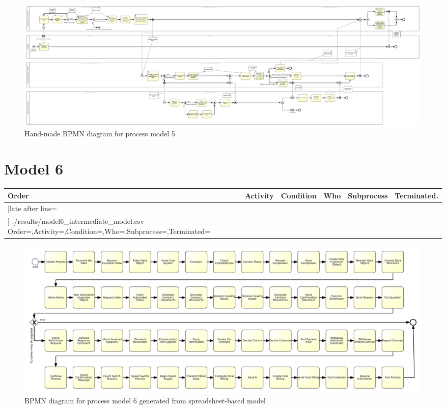 \begin{figure}[H]
	\centering
	\includegraphics[width=0.95\textheight, angle=90]{./bpmn/model5.pdf}
	\caption{Hand-made BPMN diagram for process model 5}
	\label{bpmn:model5}
\end{figure}

\section{Model 6}
\begin{tcolorbox}[
	breakable,
	arc=0mm,
	left=1pt,
	right = 1pt,
	boxrule=0mm,
	colback = {white},
	]
	\texttt{}
\end{tcolorbox}
\label{txt:model6}
\newpage

{\scriptsize
	\begin{longtable}{|p{0.03 \hsize}|p{0.25 \hsize}|p{0.15 \hsize}|p{0.2 \hsize}|p{0.1 \hsize}|p{0.1 \hsize}|}
		\hline
		Order & Activity & Condition & Who & Subprocess & Terminated.
		\\\hline\hline
		\csvreader[late after line=\\\hline]
		{./results/model6_intermediate_model.csv}
		{Order=\Order,Activity=\Activity,Condition=\Condition,Who=\Who,Subprocess=\Subprocess,Terminated=\Terminated}
		{\Order & \Activity & \Condition & \Who & \Subprocess & \Terminated}
		\caption{Spreadsheet-based description for process model 6}
		\label{csv:model6}
	\end{longtable}
}

\begin{figure}[H]
	\centering
	\includegraphics[width=0.95\textheight, angle=90]{./generated_bpmn/model6.pdf}
	\caption{BPMN diagram for process model 6 generated from spreadsheet-based model}
	\label{bpmn:generated_model6}
\end{figure}

